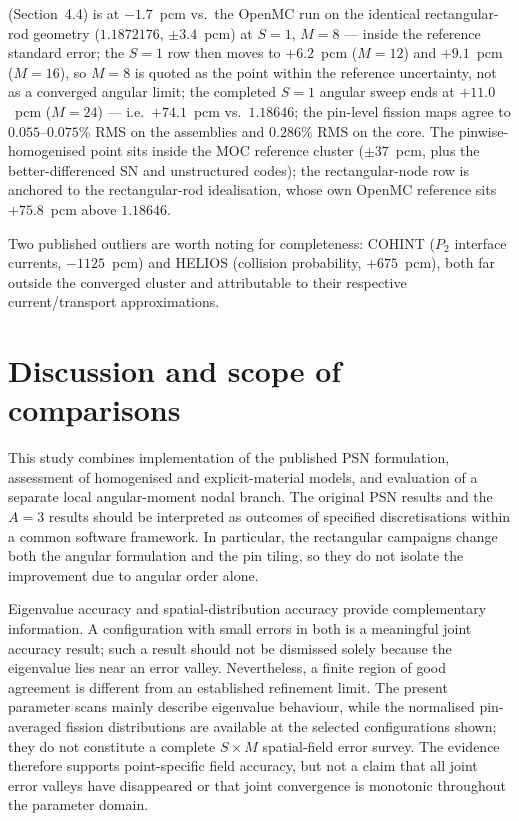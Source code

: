 \documentclass[11pt,a4paper]{article}
\begin{document}
\begin{itemize}
  (Section~4.4) is at
  $-1.7$~pcm vs.\ the OpenMC run on the identical rectangular-rod geometry
  ($1.1872176$, $\pm3.4$~pcm) at $S{=}1$, $M{=}8$ --- inside the reference
  standard error; the $S{=}1$ row then moves to $+6.2$~pcm ($M{=}12$)
  and $+9.1$~pcm ($M{=}16$), so $M{=}8$ is quoted as the point within
  the reference uncertainty, not as a converged angular limit; the
  completed $S{=}1$ angular sweep ends at $+11.0$~pcm ($M{=}24$) --- i.e.\
  $+74.1$~pcm vs.\ $1.18646$; the pin-level fission maps agree to
  $0.055$--$0.075\%$ RMS on the assemblies and $0.286\%$ RMS on the core.
  The pinwise-homogenised point sits inside the MOC reference cluster
  ($\pm37$~pcm, plus the better-differenced SN and unstructured codes);
  the rectangular-node row is anchored to the rectangular-rod
  idealisation, whose own OpenMC reference sits $+75.8$~pcm above
  $1.18646$.
\end{itemize}

Two published outliers are worth noting for completeness: COHINT
($P_2$ interface currents, $-1125$~pcm) and HELIOS (collision probability,
$+675$~pcm), both far outside the converged cluster and attributable to
their respective current/transport approximations.

\section{Discussion and scope of comparisons}

This study combines implementation of the published PSN formulation,
assessment of homogenised and explicit-material models, and evaluation
of a separate local angular-moment nodal branch. The original PSN
results and the $A{=}3$ results should be interpreted as outcomes of
specified discretisations within a common software framework. In
particular, the rectangular campaigns change both the angular
formulation and the pin tiling, so they do not isolate the improvement
due to angular order alone.

Eigenvalue accuracy and spatial-distribution accuracy provide
complementary information. A configuration with small errors in both is
a meaningful joint accuracy result; such a result should not be
dismissed solely because the eigenvalue lies near an error valley.
Nevertheless, a finite region of good agreement is different from an
established refinement limit. The present parameter scans mainly
describe eigenvalue behaviour, while the normalised pin-averaged
fission distributions are available at the selected configurations
shown; they do not constitute a complete $S\times M$ spatial-field
error survey. The evidence therefore supports point-specific field
accuracy, but not a claim that all joint error valleys have
disappeared or that joint convergence is monotonic throughout the
parameter domain.
\end{document}
